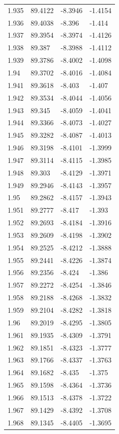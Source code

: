 \begin{tabular}{llll}
1.935 & 89.4122 & -8.3946 & -1.4154 \\
1.936 & 89.4038 & -8.396 & -1.414 \\
1.937 & 89.3954 & -8.3974 & -1.4126 \\
1.938 & 89.387 & -8.3988 & -1.4112 \\
1.939 & 89.3786 & -8.4002 & -1.4098 \\
1.94 & 89.3702 & -8.4016 & -1.4084 \\
1.941 & 89.3618 & -8.403 & -1.407 \\
1.942 & 89.3534 & -8.4044 & -1.4056 \\
1.943 & 89.345 & -8.4059 & -1.4041 \\
1.944 & 89.3366 & -8.4073 & -1.4027 \\
1.945 & 89.3282 & -8.4087 & -1.4013 \\
1.946 & 89.3198 & -8.4101 & -1.3999 \\
1.947 & 89.3114 & -8.4115 & -1.3985 \\
1.948 & 89.303 & -8.4129 & -1.3971 \\
1.949 & 89.2946 & -8.4143 & -1.3957 \\
1.95 & 89.2862 & -8.4157 & -1.3943 \\
1.951 & 89.2777 & -8.417 & -1.393 \\
1.952 & 89.2693 & -8.4184 & -1.3916 \\
1.953 & 89.2609 & -8.4198 & -1.3902 \\
1.954 & 89.2525 & -8.4212 & -1.3888 \\
1.955 & 89.2441 & -8.4226 & -1.3874 \\
1.956 & 89.2356 & -8.424 & -1.386 \\
1.957 & 89.2272 & -8.4254 & -1.3846 \\
1.958 & 89.2188 & -8.4268 & -1.3832 \\
1.959 & 89.2104 & -8.4282 & -1.3818 \\
1.96 & 89.2019 & -8.4295 & -1.3805 \\
1.961 & 89.1935 & -8.4309 & -1.3791 \\
1.962 & 89.1851 & -8.4323 & -1.3777 \\
1.963 & 89.1766 & -8.4337 & -1.3763 \\
1.964 & 89.1682 & -8.435 & -1.375 \\
1.965 & 89.1598 & -8.4364 & -1.3736 \\
1.966 & 89.1513 & -8.4378 & -1.3722 \\
1.967 & 89.1429 & -8.4392 & -1.3708 \\
1.968 & 89.1345 & -8.4405 & -1.3695 \\

\end{tabular}
